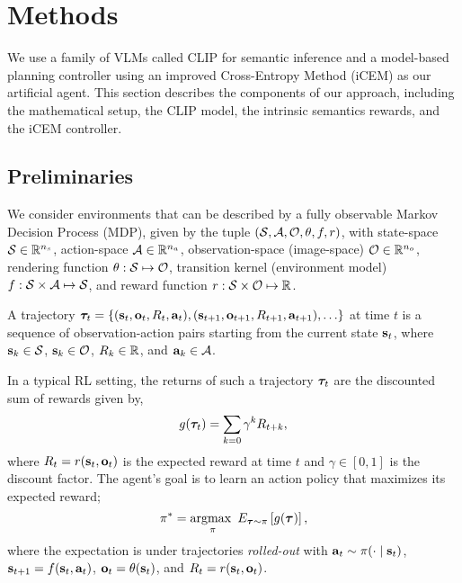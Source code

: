 \chapter{Methods}
\label{sec:methods}

We use a family of VLMs called CLIP \citep{clip} for semantic inference and a model-based planning controller using an improved Cross-Entropy Method (iCEM) \citep{icem} as our artificial agent.
This section describes the components of our approach, including the mathematical setup, the CLIP model, the intrinsic semantics rewards, and the iCEM controller.

\section{Preliminaries}
\label{sec:preliminaries}
We consider environments that can be described by a fully observable Markov Decision Process (MDP), given by the tuple \((\mathcal{S}, \mathcal{A}, \mathcal{O}, \theta, f, r)\), with state-space \(\mathcal{S} \in \mathbb{R}^{n_s}\), action-space \(\mathcal{A} \in \mathbb{R}^{n_a}\), observation-space (image-space) \(\mathcal{O} \in \mathbb{R}^{n_o}\), rendering function \(\theta: \mathcal{S} \mapsto \mathcal{O}\), transition kernel (environment model) \(f: \mathcal{S} \times \mathcal{A} \mapsto \mathcal{S}\), and reward function \(r: \mathcal{S} \times \mathcal{O} \mapsto \mathbb{R}\).

A trajectory \(\bm{\tau}_t = \{(\mathbf{s}_t, \mathbf{o}_t, R_t, \mathbf{a}_t), (\mathbf{s}_{t+1}, \mathbf{o}_{t+1}, R_{t+1}, \mathbf{a}_{t+1}), \ldots \}\) at time \(t\) is a sequence of observation-action pairs starting from the current state \(\mathbf{s}_t\), where \(\mathbf{s}_k \in \mathcal{S}\), \(\mathbf{s}_k \in \mathcal{O}\), \(R_k \in \mathbb{R}\), and \(\mathbf{a}_k \in \mathcal{A}\).

In a typical RL setting, the returns of such a trajectory \(\bm{\tau}_t\) are the discounted sum of rewards given by,
\begin{equation}
    \label{eq:rl-goal}
    g(\bm{\tau}_t) = \sum_{k=0} \gamma^k R_{t+k},
\end{equation}
where \(R_t = r(\mathbf{s}_t, \mathbf{o}_t)\) is the expected reward at time \(t\) and \(\gamma \in [0, 1]\) is the discount factor. The agent’s goal is to learn an action policy that maximizes its expected reward;
\begin{equation}
    \label{eq:rl-policy}
    \pi^* = \operatorname*{argmax~}_{\pi} E_{\bm{\tau} \sim \pi} \left[ g(\bm{\tau}) \right],
\end{equation}
where the expectation is under trajectories \textit{rolled-out} with \(\mathbf{a}_t \sim \pi(\cdot \mid \mathbf{s}_t)\), \(\mathbf{s}_{t+1} = f(\mathbf{s}_t, \mathbf{a}_t)\), \(\mathbf{o}_t = \theta(\mathbf{s}_t)\), and \(R_t = r(\mathbf{s}_t, \mathbf{o}_t)\).

